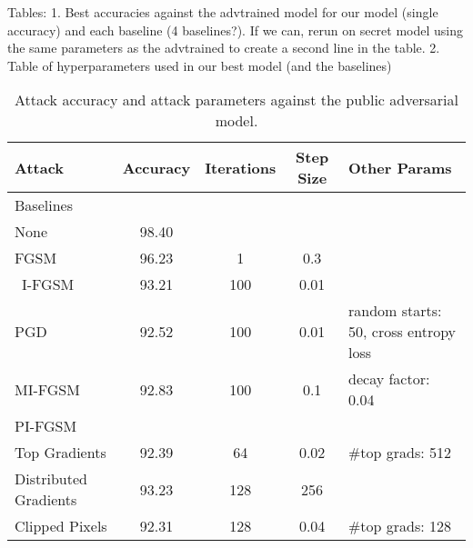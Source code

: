 Tables:
1. Best accuracies against the advtrained model for our model (single accuracy) and each baseline (4 baselines?). If we can, rerun on secret model using the same parameters as the advtrained to create a second line in the table.
2. Table of hyperparameters used in our best model (and the baselines)

\begin{table}
    \begin{center}
        \begin{tabular}{l|c|c|c|l}
            \hline
            Attack & Accuracy & Iterations & Step Size & Other Params\\
            \hline
            Baselines \\
            \hline
            None & 98.40 &&& \\
            FGSM & 96.23 & 1 & 0.3 & \\\
            I-FGSM & 93.21 & 100 & 0.01 & \\
            PGD & 92.52 & 100 & 0.01 & random starts: 50, cross entropy loss \\
            MI-FGSM & 92.83 & 100 & 0.1 & decay factor: 0.04 \\
            \hline
            PI-FGSM \\
            \hline
            Top Gradients & 92.39 & 64 & 0.02 & \#top grads: 512\\
            Distributed Gradients & 93.23 & 128 & 256 & \\
            Clipped Pixels & 92.31 & 128 & 0.04 & \#top grads: 128
        \end{tabular}
    \end{center}
    \caption{\label{tab:res_table}Attack accuracy and attack parameters against the public adversarial model.}
\end{table}